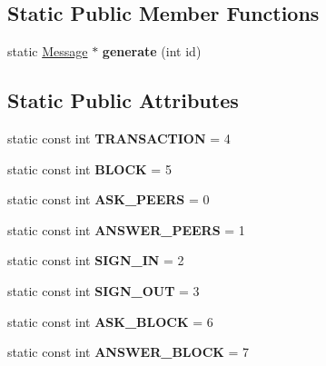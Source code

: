 \subsection*{Static Public Member Functions}
\begin{DoxyCompactItemize}
\item 
\mbox{\label{classMessage_ad92a0e1cfa5b5a503ec9c61833e3e5ea}} 
static \mbox{\hyperlink{classMessage}{Message}} $\ast$ {\bfseries generate} (int id)
\end{DoxyCompactItemize}
\subsection*{Static Public Attributes}
\begin{DoxyCompactItemize}
\item 
\mbox{\label{classMessage_a18a7a0d3879210c798f3d84c820f03c1}} 
static const int {\bfseries T\+R\+A\+N\+S\+A\+C\+T\+I\+ON} = 4
\item 
\mbox{\label{classMessage_a3d3ef3111518cd65c0b7f5ec6660888a}} 
static const int {\bfseries B\+L\+O\+CK} = 5
\item 
\mbox{\label{classMessage_a9810d3cefb1b33e709cb393583a7a877}} 
static const int {\bfseries A\+S\+K\+\_\+\+P\+E\+E\+RS} = 0
\item 
\mbox{\label{classMessage_aa33f42e5795c4df01c7437961d512eaa}} 
static const int {\bfseries A\+N\+S\+W\+E\+R\+\_\+\+P\+E\+E\+RS} = 1
\item 
\mbox{\label{classMessage_a64b7688dfdd50a6254bf45b51d2118d4}} 
static const int {\bfseries S\+I\+G\+N\+\_\+\+IN} = 2
\item 
\mbox{\label{classMessage_aba70c352293fee66004d729ccef3ee48}} 
static const int {\bfseries S\+I\+G\+N\+\_\+\+O\+UT} = 3
\item 
\mbox{\label{classMessage_a62ac5b91838e79a11079869015261e14}} 
static const int {\bfseries A\+S\+K\+\_\+\+B\+L\+O\+CK} = 6
\item 
\mbox{\label{classMessage_a1580f4a26d125f71e2af1ef6001ac656}} 
static const int {\bfseries A\+N\+S\+W\+E\+R\+\_\+\+B\+L\+O\+CK} = 7
\end{DoxyCompactItemize}
